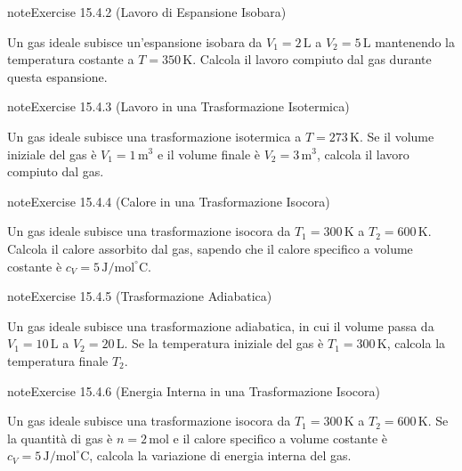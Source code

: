 \documentclass[letterpaper,10pt,italian]{jupyterBook}
\begin{document}
\begin{sphinxadmonition}{note}{Exercise 15.4.2 (Lavoro di Espansione Isobara)}



\sphinxAtStartPar
Un gas ideale subisce un’espansione isobara da \(V_1 = 2 \, \text{L}\) a \(V_2 = 5 \, \text{L}\) mantenendo la temperatura costante a \(T = 350 \, \text{K}\). Calcola il lavoro compiuto dal gas durante questa espansione.
\end{sphinxadmonition}
 \label{exercise:ch/thermodynamics/matter-problems-exercise-2}

\begin{sphinxadmonition}{note}{Exercise 15.4.3 (Lavoro in una Trasformazione Isotermica)}



\sphinxAtStartPar
Un gas ideale subisce una trasformazione isotermica a \(T = 273 \, \text{K}\). Se il volume iniziale del gas è \(V_1 = 1 \, \text{m}^3\) e il volume finale è \(V_2 = 3 \, \text{m}^3\), calcola il lavoro compiuto dal gas.
\end{sphinxadmonition}
 \label{exercise:ch/thermodynamics/matter-problems-exercise-3}

\begin{sphinxadmonition}{note}{Exercise 15.4.4 (Calore in una Trasformazione Isocora)}



\sphinxAtStartPar
Un gas ideale subisce una trasformazione isocora da \(T_1 = 300 \, \text{K}\) a \(T_2 = 600 \, \text{K}\). Calcola il calore assorbito dal gas, sapendo che il calore specifico a volume costante è \(c_V = 5 \, \text{J/mol}^\circ \text{C}\).
\end{sphinxadmonition}
 \label{exercise:ch/thermodynamics/matter-problems-exercise-4}

\begin{sphinxadmonition}{note}{Exercise 15.4.5 (Trasformazione Adiabatica)}



\sphinxAtStartPar
Un gas ideale subisce una trasformazione adiabatica, in cui il volume passa da \(V_1 = 10 \, \text{L}\) a \(V_2 = 20 \, \text{L}\). Se la temperatura iniziale del gas è \(T_1 = 300 \, \text{K}\), calcola la temperatura finale \(T_2\).
\end{sphinxadmonition}
 \label{exercise:ch/thermodynamics/matter-problems-exercise-5}

\begin{sphinxadmonition}{note}{Exercise 15.4.6 (Energia Interna in una Trasformazione Isocora)}



\sphinxAtStartPar
Un gas ideale subisce una trasformazione isocora da \(T_1 = 300 \, \text{K}\) a \(T_2 = 600 \, \text{K}\). Se la quantità di gas è \(n = 2 \, \text{mol}\) e il calore specifico a volume costante è \(c_V = 5 \, \text{J/mol}^\circ \text{C}\), calcola la variazione di energia interna del gas.
\end{sphinxadmonition}
 \label{exercise:ch/thermodynamics/matter-problems-exercise-6}
\end{document}
